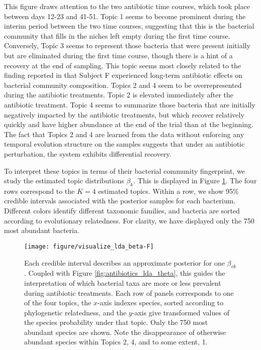 \documentclass[oupdraft]{bio}
\begin{document}
This figure draws attention to the two antibiotic time courses, which took place
between days 12-23 and 41-51. Topic 1 seems to become prominent during the
interim period between the two time courses, suggesting that this is the
bacterial community that fills in the niches left empty during the first time
course. Conversely, Topic 3 seems to represent those bacteria that were present
initially but are eliminated during the first time course, though there is a
hint of a recovery at the end of sampling. This topic seems most closely related
to the finding reported in \cite{dethlefsen2011incomplete} that Subject F
experienced long-term antibiotic effects on bacterial community composition.
Topics 2 and 4 seem to be overrepresented during the antibiotic treatments.
Topic 2 is elevated immediately after the antibiotic treatment. Topic 4 seems to
summarize those bacteria that are initially negatively impacted by the
antibiotic treatments, but which recover relatively quickly and have higher
abundance at the end of the trial than at the beginning. The fact that Topics 2
and 4 are learned from the data without enforcing any temporal evolution
structure on the samples suggests that under an antibiotic perturbation, the
system exhibits differential recovery.

To interpret these topics in terms of their bacterial community fingerprint, we
study the estimated topic distributions $\beta_{k}$. This is displayed in Figure
\ref{fig:antibiotics_lda_beta}. The four rows correspond to the $K = 4$
estimated topics. Within a row, we show 95\% credible intervals associated with
the posterior samples for each bacterium. Different colors identify different
taxonomic families, and bacteria are sorted according to evolutionary
relatedness. For clarity, we have displayed only the 750 most abundant bacteria.

\begin{figure}[!p]
  \centering\texttt{[image: figure/visualize\_lda\_beta-F]}
  \caption{Each credible interval describes an approximate posterior for one
    $\beta_{vk}$. Coupled with Figure \ref{fig:antibiotics_lda_theta}, this
    guides the interpretation of which bacterial taxa are more or less prevalent
    during antibiotic treatments. Each row of panels corresponds to one of the
    four topics, the $x$-axis indexes species, sorted according to phylogenetic
    relatedness, and the $y$-axis give transformed values of the species probability
    under that topic. Only the 750 most abundant species are shown. Note the
    disappearance of otherwise abundant species within Topics 2, 4, and to some
    extent, 1.} \label{fig:antibiotics_lda_beta}
\end{figure}
\end{document}
